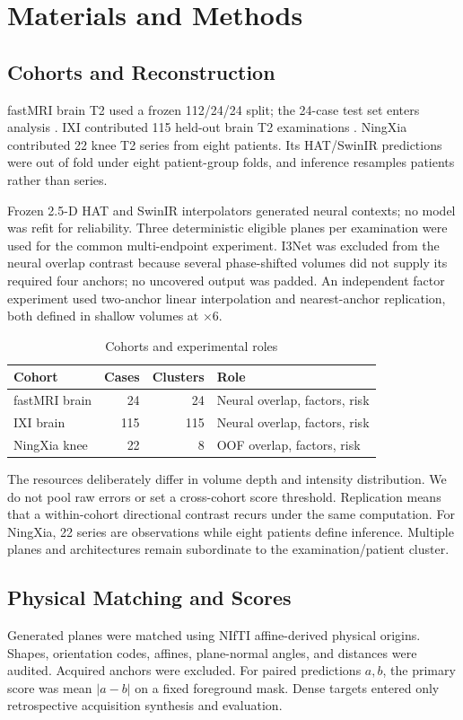 \documentclass[journal,10pt]{IEEEtran}
\begin{document}
\section{Materials and Methods}
\subsection{Cohorts and Reconstruction}
fastMRI brain T2 used a frozen 112/24/24 split; the 24-case test set enters analysis \cite{zbontar2018fastmri,knoll2020fastmri}. IXI contributed 115 held-out brain T2 examinations \cite{ixi_dataset}. NingXia contributed 22 knee T2 series from eight patients. Its HAT/SwinIR predictions were out of fold under eight patient-group folds, and inference resamples patients rather than series.

Frozen 2.5-D HAT and SwinIR interpolators generated neural contexts; no model was refit for reliability. Three deterministic eligible planes per examination were used for the common multi-endpoint experiment. I3Net was excluded from the neural overlap contrast because several phase-shifted volumes did not supply its required four anchors; no uncovered output was padded. An independent factor experiment used two-anchor linear interpolation and nearest-anchor replication, both defined in shallow volumes at $\times6$.

\begin{table}[t]
\caption{Cohorts and experimental roles}
\label{tab:data}\centering
\begin{tabular}{lrrp{3.0cm}}
\toprule
Cohort&Cases&Clusters&Role\\
\midrule
fastMRI brain&24&24&Neural overlap, factors, risk\\
IXI brain&115&115&Neural overlap, factors, risk\\
NingXia knee&22&8&OOF overlap, factors, risk\\
\bottomrule
\end{tabular}
\end{table}

The resources deliberately differ in volume depth and intensity distribution. We do not pool raw errors or set a cross-cohort score threshold. Replication means that a within-cohort directional contrast recurs under the same computation. For NingXia, 22 series are observations while eight patients define inference. Multiple planes and architectures remain subordinate to the examination/patient cluster.

\subsection{Physical Matching and Scores}
Generated planes were matched using NIfTI affine-derived physical origins. Shapes, orientation codes, affines, plane-normal angles, and distances were audited. Acquired anchors were excluded. For paired predictions $a,b$, the primary score was mean $|a-b|$ on a fixed foreground mask. Dense targets entered only retrospective acquisition synthesis and evaluation.
\end{document}
